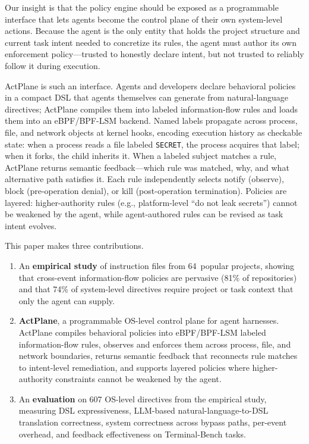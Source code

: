 Our insight is that the policy engine should be exposed as a
programmable interface that lets agents become the control plane of
their own system-level actions. Because the agent is the only entity
that holds the project structure and current task intent needed to
concretize its rules, the agent must author its own enforcement
policy---trusted to honestly declare intent, but not trusted to
reliably follow it during execution.

ActPlane is such an interface. Agents and developers declare behavioral
policies in a compact DSL that agents themselves can generate from
natural-language directives; ActPlane compiles them into labeled
information-flow rules and loads them into an eBPF/BPF-LSM backend. Named
labels propagate across process, file, and network objects at kernel hooks,
encoding execution history as checkable state: when a process reads a file
labeled \texttt{SECRET}, the process acquires that label; when it forks, the
child inherits it. When a labeled subject matches a rule, ActPlane returns
semantic feedback---which rule was matched, why, and what alternative path
satisfies it. Each rule independently selects notify (observe), block
(pre-operation denial), or kill (post-operation termination).
Policies are layered: higher-authority rules (e.g., platform-level
``do not leak secrets'') cannot be weakened by the agent, while
agent-authored rules can be revised as task intent evolves.


This paper makes three contributions.

\begin{enumerate}
\item An \textbf{empirical study} of instruction files from 64~popular
projects, showing that cross-event information-flow policies are pervasive
(81\% of repositories) and that 74\% of system-level directives require
project or task context that only the agent can supply.

\item \textbf{ActPlane}, a programmable OS-level control plane for agent
harnesses. ActPlane compiles behavioral policies into eBPF/BPF-LSM labeled
information-flow rules, observes and enforces them across process, file,
and network boundaries, returns semantic feedback that reconnects rule
matches to intent-level remediation, and supports layered policies where
higher-authority constraints cannot be weakened by the agent.

\item An \textbf{evaluation} on 607 OS-level directives from the
empirical study, measuring DSL expressiveness, LLM-based
natural-language-to-DSL translation correctness, system correctness
across bypass paths, per-event overhead, and feedback effectiveness on
Terminal-Bench tasks.
\end{enumerate}
